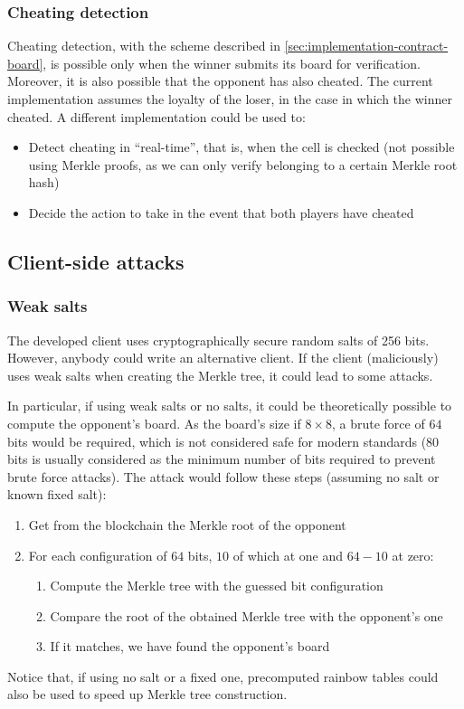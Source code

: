 \subsubsection{Cheating detection}
Cheating detection, with the scheme described in
\cref{sec:implementation-contract-board}, is possible only when the winner
submits its board for verification. Moreover, it is also possible that the
opponent has also cheated. The current implementation assumes the loyalty of
the loser, in the case in which the winner cheated. A different implementation
could be used to:
\begin{itemize}
	\item Detect cheating in ``real-time'', that is, when the cell is checked (not
	      possible using Merkle proofs, as we can only verify belonging to a certain
	      Merkle root hash)
	\item Decide the action to take in the event that both players have cheated
\end{itemize}

\subsection{Client-side attacks}
\subsubsection{Weak salts}
The developed client uses cryptographically secure random salts of 256 bits.
However, anybody could write an alternative client. If the client (maliciously)
uses weak salts when creating the Merkle tree, it could lead to some attacks.

In particular, if using weak salts or no salts, it could be theoretically
possible to compute the opponent's board. As the board's size if $8 \times 8$,
a brute force of $64$ bits would be required, which is not considered safe for
modern standards ($80$ bits is usually considered as the minimum number of bits
required to prevent brute force attacks). The attack would follow these steps
(assuming no salt or known fixed salt):
\begin{enumerate}
	\item Get from the blockchain the Merkle root of the opponent
	\item For each configuration of $64$ bits, $10$ of which at one and $64-10$ at zero:
	      \begin{enumerate}
		      \item Compute the Merkle tree with the guessed bit configuration
		      \item Compare the root of the obtained Merkle tree with the opponent's one
		      \item If it matches, we have found the opponent's board
	      \end{enumerate}
\end{enumerate}
Notice that, if using no salt or a fixed one, precomputed rainbow tables could
also be used to speed up Merkle tree construction.

